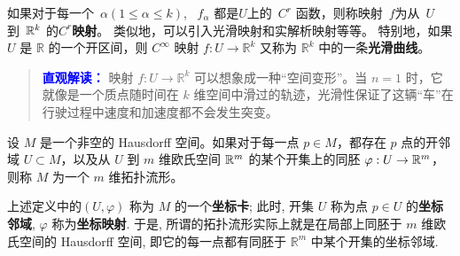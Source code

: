 如果对于每一个~$\alpha (1 \le \alpha \le k)$, ~$f_\alpha $ 都是$U$上的~$C^{r}$ 函数，则称映射~$f$为从~$U$ 到~$\mathbb{R}^k$ 的{\bf $C^{r}$映射}。
类似地，可以引入光滑映射和实解析映射等等。
特别地，如果  $U$  是  $\mathbb{R}$  的一个开区间，则  $C^\infty$  映射  $f:U\to \mathbb{R}^{k}$  又称为  $\mathbb{R}^k$  中的一条{\bf 光滑曲线}。

\begin{quote}
\textbf{\textcolor{blue}{直观解读：}}
映射 $f: U \to \mathbb{R}^k$ 可以想象成一种“空间变形”。当 $n=1$ 时，它就像是一个质点随时间在 $k$ 维空间中滑过的轨迹，光滑性保证了这辆“车”在行驶过程中速度和加速度都不会发生突变。
\end{quote}

\begin{definition}[拓扑流形]
    设 $M$ 是一个非空的 Hausdorff 空间。如果对于每一点 $p \in M$，都存在 $p$ 点的开邻域 $U \subset M$，以及从 $U$ 到 $m$ 维欧氏空间 $\mathbb{R}^m$ 的某个开集上的同胚 $\varphi: U \to \mathbb{R}^m$，则称 $M$ 为一个 $m$ 维拓扑流形。
\end{definition}

上述定义中的$(U, \varphi)$ 称为 $M$ 的一个{\bf 坐标卡}; 此时, 开集  $U$  称为点  $p \in U$  的{\bf 坐标邻域},  $\varphi$  称为{\bf 坐标映射}. 于是, 所谓的拓扑流形实际上就是在局部上同胚于  $m$  维欧氏空间的 Hausdorff 空间, 即它的每一点都有同胚于  $\mathbb{R}^m$  中某个开集的坐标邻域.

